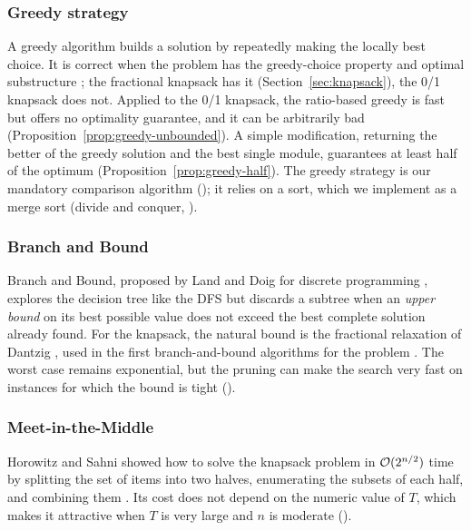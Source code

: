 \subsubsection{Greedy strategy}

A greedy algorithm builds a solution by repeatedly making the locally best choice. It is correct when the problem has the greedy-choice property and optimal substructure \cite{cormen2022}; the fractional knapsack has it (Section~\ref{sec:knapsack}), the 0/1 knapsack does not. Applied to the 0/1 knapsack, the ratio-based greedy is fast but offers no optimality guarantee, and it can be arbitrarily bad (Proposition~\ref{prop:greedy-unbounded}). A simple modification, returning the better of the greedy solution and the best single module, guarantees at least half of the optimum \cite{kellerer2004} (Proposition~\ref{prop:greedy-half}). The greedy strategy is our mandatory comparison algorithm (); it relies on a sort, which we implement as a merge sort (divide and conquer, ).

\subsubsection{Branch and Bound}

Branch and Bound, proposed by Land and Doig for discrete programming \cite{land1960}, explores the decision tree like the DFS but discards a subtree when an \emph{upper bound} on its best possible value does not exceed the best complete solution already found. For the knapsack, the natural bound is the fractional relaxation of Dantzig \cite{dantzig1957}, used in the first branch-and-bound algorithms for the problem \cite{kolesar1967,horowitz1974}. The worst case remains exponential, but the pruning can make the search very fast on instances for which the bound is tight ().

\subsubsection{Meet-in-the-Middle}

Horowitz and Sahni showed how to solve the knapsack problem in $\mathcal{O}(2^{n/2})$ time by splitting the set of items into two halves, enumerating the subsets of each half, and combining them \cite{horowitz1974}. Its cost does not depend on the numeric value of $T$, which makes it attractive when $T$ is very large and $n$ is moderate ().

